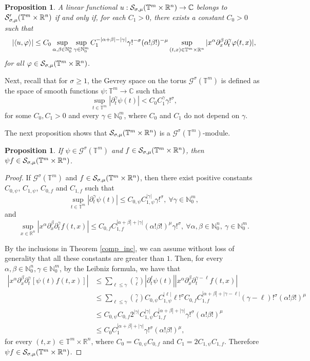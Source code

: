 \documentclass[11pt,reqno]{amsart}
\numberwithin{equation}{section}
\newtheorem{prop}[theorem]{Proposition}
\theoremstyle{definition}
\theoremstyle{definition}
\newcommand{\T}{\mathbb{T}}
\newcommand{\G}{\mathnormal{\mathbb{T}^{m}\times\mathbb{R}^n}}
\newcommand{\R}{\mathbb{R}}
\newcommand{\N}{\mathbb{N}}
\renewcommand{\S}{\mathcal{S}_{\sigma,\mu}(\G)}
\renewcommand{\SS}{\mathcal{S}'_{\sigma,\mu}(\G)}
\begin{document}
\begin{prop}\label{char_dist}
    A linear functional $u:\S\to\mathbb{C}$ belongs to $\SS$ if and only if, for each $C_1>0$, there exists a constant $C_0>0$ such that 
    \[|\langle u,\varphi\rangle| \leq C_0\sup_{\alpha,\beta\in\N_0^n}\sup_{\gamma\in\N_0^m} C_1^{-|\alpha+\beta|-|\gamma|}\gamma!^{-\sigma}(\alpha!\beta!)^{-\mu}\sup_{(t,x)\in\G}|x^\alpha\partial_x^\beta\partial_t^\gamma\varphi(t,x)|,\]
    for all $\varphi\in\S$.
\end{prop}
Next, recall that for $\sigma\geq 1$, the Gevrey space on the torus $\mathscr{G}^\sigma(\T^m)$ is defined as the space of smooth functions $\psi:\T^m\to\mathbb{C}$ such that
\begin{equation}\label{ineq_Gevrey}
   \sup_{t\in\T^m}|\partial_t^{\gamma}\psi(t)|<C_0 C_1^{\gamma} \gamma!^{\sigma},
\end{equation}
for some $C_0,C_1>0$ and every $\gamma\in \N_0^m$, where $C_0$ and $C_1$ do not depend on $\gamma$.

The next proposition shows that $\S$ is a  $\mathscr{G}^\sigma(\T^m)$-module.

\begin{prop}\label{prop_closed_under_product}
    If $\psi\in\mathscr{G}^{\sigma}(\T^m)$ and $f\in\S$, then $\psi f\in \S$. 
\end{prop}
\begin{proof}
    If $\mathscr{G}^{\sigma}(\T^m)$ and $f\in\S$, then there exist positive constants $C_{0,\psi}$, $C_{1,\psi}$, $C_{0,f}$ and $C_{1,f}$ such that
    \[\sup_{t\in\T^m}|\partial_t^\gamma\psi(t)|\leq C_{0,\psi} C_{1,\psi}^{|\gamma|}\gamma!^\sigma,\ \forall\gamma\in\N_0^m,\]
    and
    \[\sup_{x\in\R^n}|x^\alpha\partial_x^\beta\partial_t^\gamma f(t,x)|\leq C_{0,f}C_{1,f}^{|\alpha+\beta|+|\gamma|}(\alpha!\beta!)^\mu\gamma!^\sigma,\ \forall \alpha,\beta\in\N_0^n,\ \gamma\in\N_0^m.\]

    By the inclusions in Theorem \ref{comp_inc}, we can assume without loss of generality that all these constants are greater than $1$. Then, for every $\alpha,\beta\in\N_0^n,\gamma\in\N_0^m$, by the Leibniz formula, we have that
    \begin{align*}
    \left|x^\alpha\partial_x^{\beta}\partial_t^\gamma[\psi(t)f(t,x)]\right| & \leq \sum_{\ell\leq \gamma}\binom{\gamma}{\ell}|\partial_t^{\ell} \psi(t)||x^{\alpha}\partial_x^{\beta}\partial_t^{\gamma-\ell}f(t,x)|\\
    &\leq \sum_{\ell\leq \gamma}\binom{\gamma}{\ell}C_{0,\psi}C_{1,\psi}^{|\ell|}\ell!^\sigma C_{0,f}C_{1,f}^{|\alpha+\beta|+|\gamma-\ell|}(\gamma-\ell)!^{\sigma}(\alpha!\beta!)^{\mu}\\
     &\leq C_{0,\psi} C_{0,f} 2^{|\gamma|}C_{1,\psi}^{|\gamma|} C_{1,f}^{|\alpha+\beta|+|\gamma|}\gamma!^{\sigma}(\alpha!\beta!)^{\mu}\\
    &\leq C_0C_1^{|\alpha+\beta|+|\gamma|}\gamma!^{\sigma}(\alpha!\beta!)^{\mu},
    \end{align*}
     for every $(t,x)\in\T^m\times\R^n$, where $C_0=C_{0,\psi} C_{0,f}$ and $C_1=2C_{1,\psi}C_{1,f}$. Therefore $\psi f\in\S$.
\end{proof}
\end{document}
